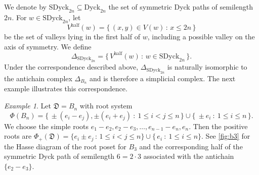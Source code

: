 \documentclass[11pt]{amsart}
\def\Dyck{\mathrm{Dyck}}
\def\half{\mathrm{half}}
\def\SDyck{\mathrm{SDyck}}
\def\fD{\mathfrak{D}}
\theoremstyle{plain}
\numberwithin{lemma}{\DefaultNumberTheoremWithin}
\numberwithin{theorem}{\DefaultNumberTheoremWithin}
\numberwithin{corollary}{\DefaultNumberTheoremWithin}
\numberwithin{proposition}{\DefaultNumberTheoremWithin}
\numberwithin{conjecture}{\DefaultNumberTheoremWithin}
\theoremstyle{definition}
\numberwithin{definition}{\DefaultNumberTheoremWithin}
\numberwithin{question}{\DefaultNumberTheoremWithin}
\numberwithin{problem}{\DefaultNumberTheoremWithin}
\theoremstyle{remark}
\numberwithin{remark}{\DefaultNumberTheoremWithin}
\newtheorem{example}{Example}
\numberwithin{example}{\DefaultNumberTheoremWithin}
\numberwithin{claim}{\DefaultNumberTheoremWithin}
\begin{document}
We denote by
$\SDyck_{2n}\subseteq\Dyck_{2n}$
the set of symmetric Dyck paths of semilength $2n$. For
$w\in\SDyck_{2n}$, let
\[
V^{\half}(w)
=
\bigl\{\,(x,y)\in V(w)\,:\,x\leq 2n\,\bigr\}
\]
be the set of valleys lying in the first half of $w$, including
a possible valley on the axis of symmetry. We define
\[
\Delta_{\SDyck_{2n}}
=
\bigl\{\,
V^{\half}(w)
\,:\,
w\in\SDyck_{2n}
\,\bigr\}.
\]
Under the correspondence described above,
$\Delta_{\SDyck_{2n}}$ is naturally isomorphic to the antichain
complex $\Delta_{B_n}$ and is therefore a simplicial complex. The next
example illustrates this correspondence.

\begin{example} \label{ex:bn}
   Let $\fD = B_n$ with root system 
   $$\Phi(B_n) = \big\{\, \pm (e_i-e_j), \pm(e_i+e_j)~:~ 1 \leq i < j \leq n
   \,\big\}
   \cup \big\{~\pm e_i ~:~1 \leq i \leq n\,\big\}.$$
   We choose the 
   simple roots $e_1 - e_2, e_2 - e_3,
   \ldots, e_{n-1} - e_n, e_n$.
   Then the positive roots
   are $\Phi_+(\fD) = \{ e_i \pm e_j \,:\,
   1 \leq i < j \leq n\} \cup \{ \,e_i~:~1 \leq i \leq n\}$.
   See \ref{fig:b3} for the
   Hasse diagram of the root poset for $B_3$ and
   the corresponding half of the symmetric Dyck path of semilength $6 = 2\cdot 3$ 
   associated with the antichain $\{e_2-e_3\}$.
   
\begin{figure}
\end{figure}
\end{example}
\end{document}
